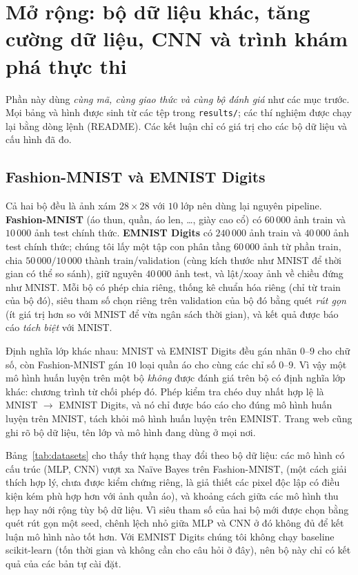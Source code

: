 \section{Mở rộng: bộ dữ liệu khác, tăng cường dữ liệu, CNN và trình khám phá thực thi}
\label{sec:extensions}

Phần này dùng \emph{cùng mã, cùng giao thức và cùng bộ đánh giá} như các mục trước. Mọi bảng và hình được sinh từ các tệp trong \texttt{results/}; các thí nghiệm được chạy lại bằng dòng lệnh (README). Các kết luận chỉ có giá trị cho các bộ dữ liệu và cấu hình đã đo.

\subsection{Fashion-MNIST và EMNIST Digits}
\label{sec:datasets}
Cả hai bộ đều là ảnh xám $28\times28$ với $10$ lớp nên dùng lại nguyên pipeline. \textbf{Fashion-MNIST} (áo thun, quần, áo len, \ldots, giày cao cổ) có $60\,000$ ảnh train và $10\,000$ ảnh test chính thức. \textbf{EMNIST Digits} có $240\,000$ ảnh train và $40\,000$ ảnh test chính thức; chúng tôi lấy một tập con phân tầng $60\,000$ ảnh từ phần train, chia $50\,000/10\,000$ thành train/validation (cùng kích thước như MNIST để thời gian có thể so sánh), giữ nguyên $40\,000$ ảnh test, và lật/xoay ảnh về chiều đứng như MNIST. Mỗi bộ có phép chia riêng, thống kê chuẩn hóa riêng (chỉ từ train của bộ đó), siêu tham số chọn riêng trên validation của bộ đó bằng quét \emph{rút gọn} (ít giá trị hơn so với MNIST để vừa ngân sách thời gian), và kết quả được báo cáo \emph{tách biệt} với MNIST.

Định nghĩa lớp khác nhau: MNIST và EMNIST Digits đều gán nhãn $0$--$9$ cho chữ số, còn Fashion-MNIST gán $10$ loại quần áo cho cùng các chỉ số $0$--$9$. Vì vậy một mô hình huấn luyện trên một bộ \emph{không} được đánh giá trên bộ có định nghĩa lớp khác: chương trình từ chối phép đó. Phép kiểm tra chéo duy nhất hợp lệ là MNIST $\to$ EMNIST Digits, và nó chỉ được báo cáo cho đúng mô hình huấn luyện trên MNIST, tách khỏi mô hình huấn luyện trên EMNIST. Trang web cũng ghi rõ bộ dữ liệu, tên lớp và mô hình đang dùng ở mọi nơi.



Bảng~\ref{tab:datasets} cho thấy thứ hạng thay đổi theo bộ dữ liệu: các mô hình có cấu trúc (MLP, CNN) vượt xa Naïve Bayes trên Fashion-MNIST, (một cách giải thích hợp lý, chưa được kiểm chứng riêng, là giả thiết các pixel độc lập có điều kiện kém phù hợp hơn với ảnh quần áo), và khoảng cách giữa các mô hình thu hẹp hay nới rộng tùy bộ dữ liệu. Vì siêu tham số của hai bộ mới được chọn bằng quét rút gọn một seed, chênh lệch nhỏ giữa MLP và CNN ở đó không đủ để kết luận mô hình nào tốt hơn. Với EMNIST Digits chúng tôi không chạy baseline scikit-learn (tốn thời gian và không cần cho câu hỏi ở đây), nên bộ này chỉ có kết quả của các bản tự cài đặt.

